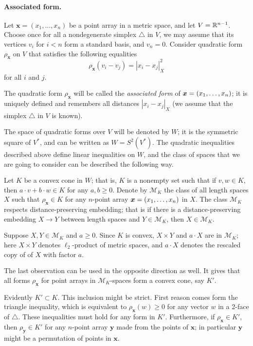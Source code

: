 \documentclass[a4paper,10pt]{article}
\begin{document}
\paragraph{Associated form.}\label{Associated form}
Let $\bm{x}=(x_1,\dots,x_n)$ be a point array in a metric space, and let $V\z=\RR^{n-1}$.
Choose once for all a nondegenerate simplex $\triangle$ in $V$,
we may assume that its vertices $v_i$ for $i<n$ form a standard basis, and $v_n=0$.
Consider quadratic form $\rho_{\bm{x}}$ on $V$ that satisfies the following equalities
\[\rho_{\bm{x}}(v_i-v_j)=|x_i-x_j|^2_X\] 
for all $i$ and $j$.

The quadratic form $\rho_{\bm{x}}$ will be called the \emph{associated form} of $\bm{x}=(x_1,\z\dots,x_n)$;
it is uniquely defined and remembers all distances $|x_i-x_j|_X$
(we assume that the simplex $\triangle$ in $V$ is known).

The space of quadratic forms over $V$ will be denoted by $W$;
it is the symmetric square of $V^*$, and can be written as $W=S^2(V^*)$.
The quadratic inequalities described above define linear inequalities on $W$,
and the class of spaces that we are going to consider can be described the following way.

Let $K$ be a convex cone in $W$;
that is, $K$ is a nonempty set such that if $v,w\in K$, then $a\cdot v+b\cdot w\in K$ for any $a,b\ge0$.
Denote by $\mathcal{M}_K$ the class of all length spaces $X$ such that
$\rho_{\bm{x}}\in K$ for any $n$-point array $\bm{x}\z=(x_1,\dots,x_n)$ in $X$.
The class $\mathcal{M}_K$ respects distance-preserving embedding; that is
if there is a distance-preserving embedding $X\to Y$ between length spaces and $Y \in  \mathcal{M}_K$, then $X\in \mathcal{M}_K$.

Suppose $X,Y\in  \mathcal{M}_K$ and $a\ge 0$.
Since $K$ is convex,  $X\times Y$ and $a\cdot X$ are in $\mathcal{M}_K$;
here $X\times Y$ denotes $\ell_2$-product of metric spaces, and 
$a\cdot X$ denotes the rescaled copy of of $X$ with factor $a$. 

The last observation can be used in the opposite direction as well.
It gives that all forms $\rho_{\bm{x}}$ for point arrays in $\mathcal{M}_K$-spaces form a convex cone, say $K'$.

Evidently $K'\subset K$.
This inclusion might be strict.
First reason comes form the triangle inequality, which is equivalent to $\rho_{\bm{x}}(w)\ge 0$ for any vector $w$ in a 2-face of $\triangle$.
These inequalities must hold for any form in $K'$.
Furthermore, if $\rho_{\bm{x}}\in K'$, then $\rho_{\bm{y}}\in K'$ for any $n$-point array $\bm{y}$ made from the points of $\bm{x}$; in particular $\bm{y}$ might be a permutation of points in $\bm{x}$.
\end{document}
